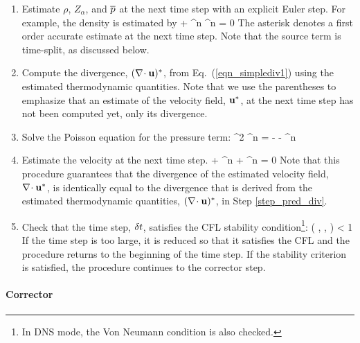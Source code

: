\begin{enumerate}
\item Estimate $\rho$, $Z_\alpha$, and $\overline{p}$ at the next time step with an explicit Euler step. For
example, the density is estimated by
\be {} + \nabla\!\cdot \rho^n \bu^n = 0 \ee
The asterisk denotes a first order accurate estimate at the next time step.  Note that the source term is time-split, as discussed below.

\item \label{step_pred_div} Compute the divergence, $(\nabla\!\cdot {\bf u})^*$, from Eq.~(\ref{eqn_simplediv1}) using the estimated thermodynamic quantities. Note that we use the parentheses to emphasize that an estimate of the velocity field, ${\bf u}^*$, at the next time step has not been computed yet, only its divergence.

\item Solve the Poisson equation for the pressure term:
\be \nabla^2 \cH^n = -  - \nabla\!\cdot \bF^n \ee

\item Estimate the velocity at the next time step.
\be
{} +  \bF^n + ^n = 0
\ee
Note that this procedure guarantees that the divergence of the estimated velocity field, $\nabla\!\cdot {\bf u}^*$, is identically
equal to the divergence that is derived from the estimated thermodynamic quantities, $(\nabla\!\cdot {\bf u})^*$, in Step \ref{step_pred_div}.

\item Check that the time step, $\delta t$, satisfies the CFL stability condition\footnote{In DNS mode, the Von Neumann condition is also checked.}:
\be \dt \; \max\left( , ,  \right) < 1 \quad \ee
If the time step is too large, it is reduced so that it satisfies
the CFL and the procedure returns to the beginning of the time step.
If the stability criterion is satisfied, the procedure continues to the corrector step.
\end{enumerate}

\paragraph{Corrector}

